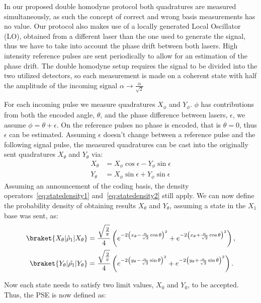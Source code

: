 In our proposed double homodyne protocol both quadratures are measured simultaneously, as such the concept of correct and wrong basis measurements has no value. Our protocol also makes use of a locally generated Local Oscillator (LO), obtained from a different laser than the one used to generate the signal, thus we have to take into account the phase drift between both lasers. High intensity reference pulses are sent periodically to allow for an estimation of the phase drift. The double homodyne setup requires the signal to be divided into the two utilized detectors, so each measurement is made on a coherent state with half the amplitude of the incoming signal $\alpha\rightarrow\frac{\alpha}{\sqrt{2}}$
\par
For each incoming pulse we measure quadratures $X_\phi$ and $Y_\phi$. $\phi$ has contributions from both the encoded angle, $\theta$, and the phase difference between lasers, $\epsilon$, we assume $\phi=\theta+\epsilon$. On the reference pulses no phase is encoded, that is $\theta=0$, thus $\epsilon$ can be estimated. Assuming $\epsilon$ doesn't change between a reference pulse and the following signal pulse, the measured quadratures can be cast into the originally sent quadratures $X_\theta$ and $Y_\theta$ via:
\begin{equation}
\begin{aligned}
X_\theta&=X_\phi\cos\epsilon-Y_\phi\sin\epsilon\\
Y_\theta&=X_\phi\sin\epsilon+Y_\phi\sin\epsilon
\end{aligned}
\end{equation}
Assuming an announcement of the coding basis, the density operators~\eqref{eq:statedensity1} and~\eqref{eq:statedensity2} still apply. We can now define the probability density of obtaining results $X_\theta$ and $Y_\theta$, assuming a state in the $X_1$ base was sent, as:
\begin{align}
\braket{X_\theta|\hat{\rho}_1|X_\theta}&= \frac{\sqrt{\frac{2}{\pi}}}{4}\left(e^{-2\left(x_\theta-\frac{\alpha}{\sqrt{2}}\cos\theta\right)^2}+e^{-2\left(x_\theta+\frac{\alpha}{\sqrt{2}}\cos\theta\right)^2}\right),\\
\braket{Y_\theta|\hat{\rho_1}|Y_\theta}&= \frac{\sqrt{\frac{2}{\pi}}}{4}\left(e^{-2\left(y_\theta-\frac{\alpha}{\sqrt{2}}\sin\theta\right)^2}+e^{-2\left(y_\theta+\frac{\alpha}{\sqrt{2}}\sin\theta\right)^2}\right).
\end{align}
\par
Now each state needs to satisfy two limit values, $X_0$ and $Y_0$, to be accepted. Thus, the PSE is now defined as:
